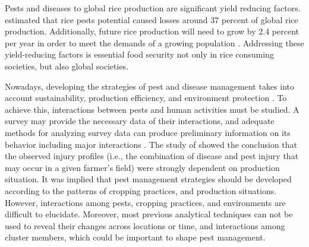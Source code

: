 
Pests and diseases to global rice production are significant yield reducing factors.  estimated that rice pests potential caused losses around 37 percent of global rice production. Additionally, future rice production will need to grow by 2.4 percent per year in order to meet the demands of a growing population . Addressing these yield-reducing factors is essential food security not only in rice consuming societies, but also global societies. 

Nowadays, developing the strategies of pest and disease management takes into account sustainability, production efficiency, and environment protection \cite{Mew:2004kh}. To achieve this, interactions between pests and human activities must be studied. A survey may provide the necessary data of their interactions, and adequate methods for analyzing survey data can produce preliminary information on its behavior including major interactions . The study of  showed the conclusion that the observed injury profiles (i.e., the combination of disease and pest injury that may occur in a given farmer’s field) were strongly dependent on production situation. It was implied that pest management strategies should be developed according to the patterns of cropping practices, and production situations. However, interactions among pests, cropping practices, and environments are difficult to elucidate. Moreover, most previous analytical techniques can not be used to reveal their changes across locations or time, and interactions among cluster members, which could be important to shape pest management. 

